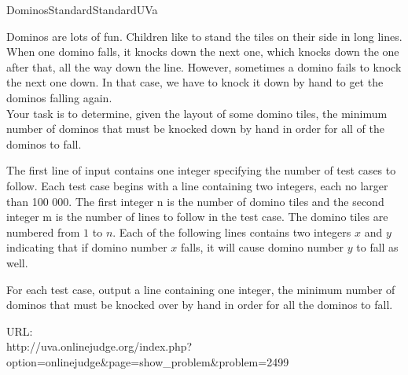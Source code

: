 \begin{problema}{Dominos}{Standard}{Standard}{UVa}

Dominos are lots of fun. Children like to stand the tiles on their side in long lines. When one domino falls, it knocks down the next one, which knocks down the one after that, all the way down the line. However, sometimes a domino fails to knock the next one down. In that case, we have to knock it down by hand to get the dominos falling again. \\

Your task is to determine, given the layout of some domino tiles, the minimum number of dominos that must be knocked down by hand in order for all of the dominos to fall. \\



\InputFile

The first line of input contains one integer specifying the number of test cases to follow. Each test case begins with a line containing two integers, each no larger than 100 000. The first integer n is the number of domino tiles and the second integer m is the number of lines to follow in the test case. The domino tiles are numbered from $1$ to $n$. Each of the following lines contains two integers $x$ and $y$ indicating that if domino number $x$ falls, it will cause domino number $y$ to fall as well. \\


\OutputFile

For each test case, output a line containing one integer, the minimum number of dominos that must be knocked over by hand in order for all the dominos to fall.  \\


\Example




URL:\\ 
http://uva.onlinejudge.org/index.php? \\
option=onlinejudge\&page=show\_problem\&problem=2499

\end{problema}
